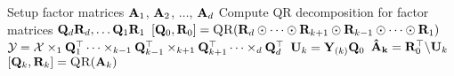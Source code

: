 \begin{algorithmic}[1]
      \State Setup factor matrices  $\mathbf{A}_1$, $\mathbf{A}_2$, $\dots$, $\mathbf{A}_d$
      \State Compute QR decomposition for factor matrices $\mathbf{Q}_d\mathbf{R}_d, \dots \mathbf{Q}_1\mathbf{R}_1$
      \State $[\mat{Q}_0,\mat{R}_0] = \Call{QR}{\mat{R}_d \odot \cdots \odot \mat{R}_{k+1} \odot \mat{R}_{k-1} \odot \cdots \odot \mat{R}_1}$
      \State ${\mathbf{\cal{Y}}} =  {\mathbf{\cal{X}}} \times_1 \mathbf{Q}_1^\top \dots \times_{k-1} \mathbf{Q}_{k-1}^\top \times_{k+1} \mathbf{Q}_{k+1}^\top \dots \times_d \mathbf{Q}_d^\top$  \label{l:EXP-TTM}
      \State $\mathbf{U}_k = \mathbf{Y}_{(k)}\mathbf{Q}_0$ \label{l:apply}
      \State $\mathbf{\hat{A}_k} = \mathbf{R}_0^\top \text{\textbackslash} \mathbf{U}_k$ 
      \State $[\mat{Q}_k,\mat{R}_k] = \Call{QR}{\mat{A}_k}$      
      \EndFor
      \EndWhile
    \EndFunction
  \end{algorithmic}
